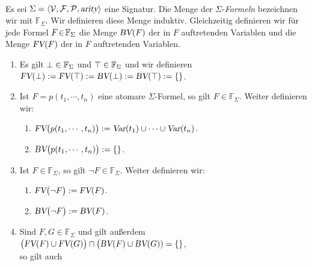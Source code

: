\begin{Definition} 
\label{praedikaten-formel} \hspace*{\fill} \\
    Es sei $\Sigma = \langle \mathcal{V}, \mathcal{F}, \mathcal{P}, \textsl{arity} \rangle$ eine Signatur.
    Die Menge der {\color{blue}$\Sigma$-\emph{Formeln}} bezeichnen wir mit $\mathbb{F}_\Sigma$.
    Wir definieren diese Menge induktiv.
    Gleichzeitig definieren wir für jede Formel $F\!\in\! \mathbb{F}_\Sigma$ die Menge $\textsl{BV}(F)$ der in $F$ 
     auftretenden Variablen und die Menge $\textsl{FV}(F)$ der in $F$  auftretenden Variablen.
    \begin{enumerate}
    \item Es gilt $\bot \in \mathbb{F}_\Sigma$ und $\top \in \mathbb{F}_\Sigma$ und wir definieren \\[0.2cm]
          \hspace*{1.3cm} $\textsl{FV}(\bot) := \textsl{FV}(\top) := \textsl{BV}(\bot) := \textsl{BV}(\top) := \{\}$.
    \item Ist $F = p(t_1,\cdots,t_n)$ eine atomare $\Sigma$-Formel, so gilt $F \in \mathbb{F}_\Sigma$.  Weiter definieren wir:
          \begin{enumerate}
          \item $\textsl{FV}\bigl(p(t_1,\cdots,t_n) \bigr) := \textsl{Var}(t_1) \cup \cdots \cup \textsl{Var}(t_n)$.
          \item $\textsl{BV}\bigl(p(t_1,\cdots,t_n) \bigr) := \{\}$.
          \end{enumerate}
    \item Ist $F \in \mathbb{F}_\Sigma$, so gilt $\neg F \in \mathbb{F}_\Sigma$. Weiter definieren wir:
          \begin{enumerate}
          \item $\textsl{FV}\bigl( \neg F \bigr) := \textsl{FV}(F)$.
          \item $\textsl{BV}\bigl( \neg F \bigr) := \textsl{BV}(F)$.
          \end{enumerate}
    \item Sind $F, G \in \mathbb{F}_\Sigma$ und gilt außerdem \\[0.2cm]
          \hspace*{1.3cm}
          $\bigl(\textsl{FV}(F) \cup \textsl{FV}(G)\bigr) \cap \bigl(\textsl{BV}(F) \cup \textsl{BV}(G)) = \{\}$,
          \\[0.2cm]
          so gilt auch
          \begin{enumerate}

\end{enumerate}
\end{enumerate}
\end{Definition}
